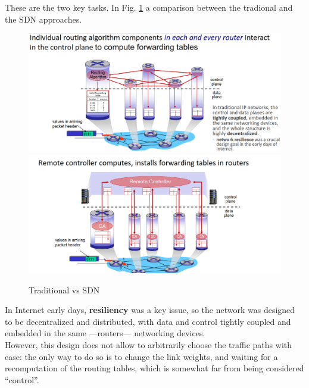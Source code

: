 These are the two key tasks. In Fig. \ref{fig:sdn_planes} a comparison between the tradional and the SDN approaches.
\begin{figure}[htbp]
   \centering
   \includegraphics[width=0.45\columnwidth]{images/sdn_planes1.png}
   \includegraphics[width=0.45\columnwidth]{images/sdn_planes2.png}
   \caption{Traditional vs SDN}
   \label{fig:sdn_planes}
   \end{figure}
In Internet early days, \textbf{resiliency} was a key issue, so the network was designed to be decentralized and distributed, with data and control tightly coupled and embedded in the same ---routers--- networking devices.\\
However, this design does not allow to arbitrarily choose the traffic paths with ease: the only way to do so is to change the link weights, and waiting for a recomputation of the routing tables, which is somewhat far from being considered ``control''.

